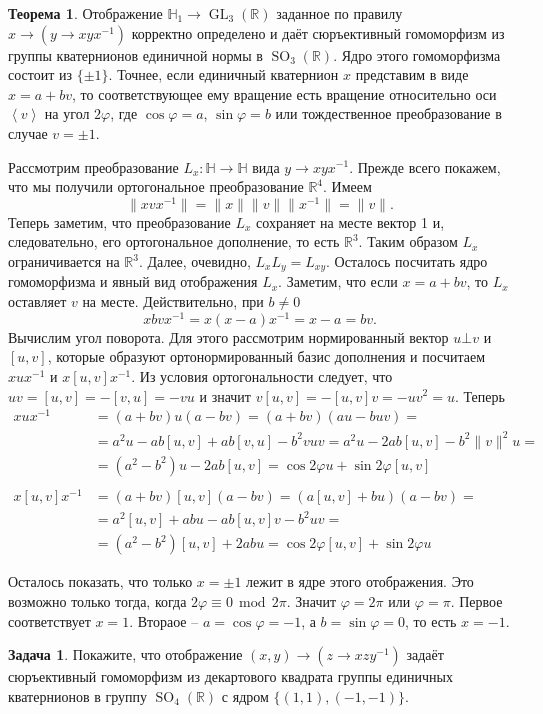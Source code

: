\documentclass[12pt,a4paper,oneside]{book}
\theoremstyle{definition}
\newtheorem{zad}{\color{violet!100!black}Задача}
\newtheorem{thm}{\color{red!40!black}Теорема}
\renewcommand{\mod}{\,\operatorname{mod}\,}
\newcommand{\GL}{\operatorname{GL}}
\newcommand{\SO}{\operatorname{SO}}
\newcommand{\R}{\mathbb R}
\renewcommand{\H}{\mathbb H}
\def\ffi{\varphi}
\def\lan{\left\langle }
\def\ran{\right\rangle}
\def\thrm{\begin{thm}}
\def\ethrm{\end{thm}}
\def\zd{\begin{zad}}
\def\ezd{\end{zad}}
\begin{document}
\thrm Отображение $\H_{1}\to \GL_3(\R)$ заданное по правилу $x\to (y \to xyx^{-1})$ корректно определено и даёт сюръективный  гомоморфизм из группы кватернионов единичной нормы в $\SO_3(\R)$. Ядро этого гомоморфизма состоит из $\{\pm 1\}$. Точнее, если единичный кватернион $x$  представим в виде $x=a+bv$, то соответствующее ему вращение есть вращение относительно  оси $\lan v \ran$ на угол $2\ffi$, где $\cos \ffi= a$, $\sin \ffi= b$ или тождественное преобразование в случае $v=\pm 1$.
\ethrm
\proof Рассмотрим преобразование $L_x \colon \H \to \H$ вида $y \to xyx^{-1}$. Прежде всего покажем, что мы получили ортогональное преобразование $\R^4$. Имеем
 $$\|xvx^{-1}\|=\|x\| \|v\| \|x^{-1}\| = \|v\|.$$
Теперь заметим, что преобразование $L_x$ сохраняет на месте вектор 1 и, следовательно, его ортогональное дополнение, то есть $\R^3$. Таким образом $L_x$ ограничивается на $\R^3$. Далее, очевидно, $L_xL_y= L_{xy}$. Осталось посчитать ядро гомоморфизма и явный вид отображения $L_x$. Заметим, что если $x=a+bv$, то $L_x$ оставляет $v$ на месте. Действительно, при $b\neq 0$ 
$$xbvx^{-1}=x(x-a)x^{-1}= x-a=bv.$$
Вычислим угол поворота. Для этого рассмотрим нормированный вектор  $u\bot v$ и $[u,v]$, которые образуют ортонормированный базис дополнения и посчитаем $xux^{-1}$ и $x[u,v]x^{-1}$. Из условия ортогональности следует, что $uv=[u,v]=-[v,u]=-vu$ и значит $v[u,v]=-[u,v]v=-uv^2=u$. Теперь
\begin{align*}
xux^{-1}&=(a+bv)u(a-bv)= (a+bv)(au-buv)=\\
&=a^2u -ab[u,v]+ab[v,u]- b^2vuv=a^2u-2ab[u,v]-b^2\|v\|^2u=\\ &=(a^2-b^2)u-2ab[u,v]=\cos2\ffi u+ \sin 2\ffi [u,v]
\\
\\
x[u,v]x^{-1}&=(a+bv)[u,v](a-bv)= (a[u,v]+bu)(a-bv)=\\
&=a^2[u,v]+abu-ab[u,v]v-b^2uv=\\
&=(a^2-b^2)[u,v]+2abu=\cos 2\ffi[u,v]+\sin 2\ffi u
\end{align*}

Осталось показать, что только $x=\pm 1$ лежит в ядре этого отображения. Это возможно только тогда, когда $2\ffi \equiv 0 \mod 2\pi$. Значит $\ffi=2 \pi$ или $\ffi= \pi$. Первое соответствует $x=1$. Втораое --  $a=\cos \ffi = -1$, а $b=\sin \ffi = 0$, то есть $x=-1$. 
\endproof


\zd
Покажите, что отображение $(x,y) \to (z \to xzy^{-1})$ задаёт сюръективный гомоморфизм из декартового квадрата группы единичных кватернионов в группу $\SO_4(\R)$ с ядром $\{(1,1),(-1,-1)\}$.
\ezd
\end{document}
